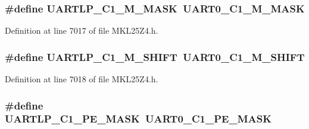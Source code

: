 \subsubsection[{\texorpdfstring{U\+A\+R\+T\+L\+P\+\_\+\+C1\+\_\+\+M\+\_\+\+M\+A\+SK}{UARTLP_C1_M_MASK}}]{\setlength{\rightskip}{0pt plus 5cm}\#define U\+A\+R\+T\+L\+P\+\_\+\+C1\+\_\+\+M\+\_\+\+M\+A\+SK~{\bf U\+A\+R\+T0\+\_\+\+C1\+\_\+\+M\+\_\+\+M\+A\+SK}}\hypertarget{group___backward___compatibility___symbols_gaf7b253cfe0dae018953b5a5f7e696beb}{}\label{group___backward___compatibility___symbols_gaf7b253cfe0dae018953b5a5f7e696beb}


Definition at line 7017 of file M\+K\+L25\+Z4.\+h.

\subsubsection[{\texorpdfstring{U\+A\+R\+T\+L\+P\+\_\+\+C1\+\_\+\+M\+\_\+\+S\+H\+I\+FT}{UARTLP_C1_M_SHIFT}}]{\setlength{\rightskip}{0pt plus 5cm}\#define U\+A\+R\+T\+L\+P\+\_\+\+C1\+\_\+\+M\+\_\+\+S\+H\+I\+FT~{\bf U\+A\+R\+T0\+\_\+\+C1\+\_\+\+M\+\_\+\+S\+H\+I\+FT}}\hypertarget{group___backward___compatibility___symbols_ga7f948b34e2c66421e265c5d499e87db6}{}\label{group___backward___compatibility___symbols_ga7f948b34e2c66421e265c5d499e87db6}


Definition at line 7018 of file M\+K\+L25\+Z4.\+h.

\subsubsection[{\texorpdfstring{U\+A\+R\+T\+L\+P\+\_\+\+C1\+\_\+\+P\+E\+\_\+\+M\+A\+SK}{UARTLP_C1_PE_MASK}}]{\setlength{\rightskip}{0pt plus 5cm}\#define U\+A\+R\+T\+L\+P\+\_\+\+C1\+\_\+\+P\+E\+\_\+\+M\+A\+SK~{\bf U\+A\+R\+T0\+\_\+\+C1\+\_\+\+P\+E\+\_\+\+M\+A\+SK}}\hypertarget{group___backward___compatibility___symbols_ga23f4f361b83573abfc5cfd6f15ef3a89}{}\label{group___backward___compatibility___symbols_ga23f4f361b83573abfc5cfd6f15ef3a89}


